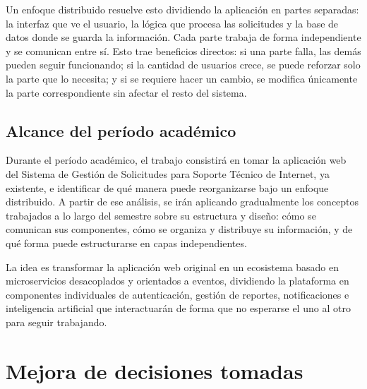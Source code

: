 \documentclass[12pt, a4paper]{report}
\begin{document}
Un enfoque distribuido resuelve esto dividiendo la aplicación en partes
separadas: la interfaz que ve el usuario, la lógica que procesa las
solicitudes y la base de datos donde se guarda la información. Cada parte
trabaja de forma independiente y se comunican entre sí. Esto trae beneficios
directos: si una parte falla, las demás pueden seguir funcionando; si la
cantidad de usuarios crece, se puede reforzar solo la parte que lo necesita;
y si se requiere hacer un cambio, se modifica únicamente la parte
correspondiente sin afectar el resto del sistema.

\newpage

\subsection*{Alcance del período académico}

Durante el período académico, el trabajo consistirá en tomar la aplicación web del Sistema de Gestión de Solicitudes para Soporte Técnico de Internet, ya existente, e identificar de qué manera puede reorganizarse bajo un enfoque distribuido. A partir de ese análisis, se irán aplicando gradualmente los conceptos trabajados a lo largo del semestre sobre su estructura y diseño: cómo se comunican sus componentes, cómo se organiza y distribuye su información, y de qué forma puede estructurarse en capas independientes.

La idea es transformar la aplicación web original en un ecosistema basado en microservicios desacoplados y orientados a eventos, dividiendo la plataforma en componentes individuales de autenticación, gestión de reportes, notificaciones e inteligencia artificial que interactuarán de forma que no esperarse el uno al otro para seguir trabajando.

\newpage

\section{Mejora de decisiones tomadas}
\end{document}
